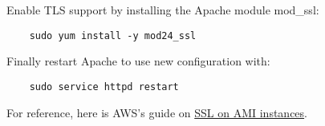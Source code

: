Enable TLS support by installing the Apache module mod\_ssl:

\begin{verbatim}
    sudo yum install -y mod24_ssl
\end{verbatim}

Finally restart Apache to use new configuration with:

\begin{verbatim}
    sudo service httpd restart
\end{verbatim}

For reference, here is AWS's guide on \href{https://docs.aws.amazon.com/AWSEC2/latest/UserGuide/SSL-on-amazon-linux-ami.html}{SSL on AMI instances}.
